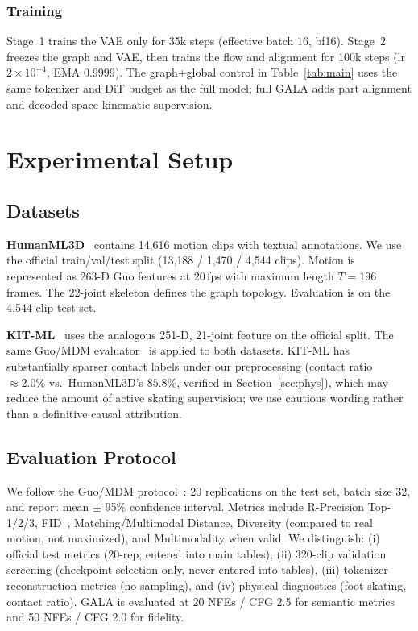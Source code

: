 \documentclass[journal]{IEEEtran}
\begin{document}
\subsubsection*{Training}
Stage~1 trains the VAE only for 35k steps (effective batch 16, bf16). Stage~2 freezes the graph and VAE, then trains the flow and alignment for 100k steps (lr $2{\times}10^{-4}$, EMA $0.9999$). The graph+global control in Table~\ref{tab:main} uses the same tokenizer and DiT budget as the full model; full GALA adds part alignment and decoded-space kinematic supervision.

\section{Experimental Setup}

\subsection{Datasets}
\label{sec:setup-data}

\textbf{HumanML3D}~\cite{guo2022humanml3d} contains 14{,}616 motion clips with textual annotations. We use the official train/val/test split (13{,}188 / 1{,}470 / 4{,}544 clips). Motion is represented as 263-D Guo features at 20\,fps with maximum length $T=196$ frames. The 22-joint skeleton defines the graph topology. Evaluation is on the 4{,}544-clip test set.

\textbf{KIT-ML}~\cite{plappert2016kit} uses the analogous 251-D, 21-joint feature on the official split. The same Guo/MDM evaluator~\cite{tevet2023mdm} is applied to both datasets. KIT-ML has substantially sparser contact labels under our preprocessing (contact ratio $\approx2.0\%$ vs.\ HumanML3D's $85.8\%$, verified in Section~\ref{sec:phys}), which may reduce the amount of active skating supervision; we use cautious wording rather than a definitive causal attribution.

\subsection{Evaluation Protocol}
\label{sec:setup-proto}

We follow the Guo/MDM protocol~\cite{guo2022humanml3d,tevet2023mdm}: 20 replications on the test set, batch size 32, and report mean $\pm$ 95\% confidence interval. Metrics include R-Precision Top-1/2/3, FID~\cite{heusel2017fid}, Matching/Multimodal Distance, Diversity (compared to real motion, not maximized), and Multimodality when valid. We distinguish: (i) official test metrics (20-rep, entered into main tables), (ii) 320-clip validation screening (checkpoint selection only, never entered into tables), (iii) tokenizer reconstruction metrics (no sampling), and (iv) physical diagnostics (foot skating, contact ratio). GALA is evaluated at 20 NFEs / CFG 2.5 for semantic metrics and 50 NFEs / CFG 2.0 for fidelity.
\end{document}
